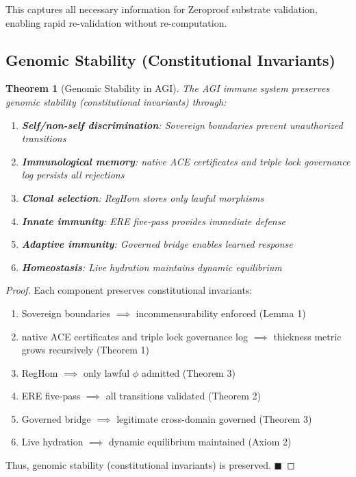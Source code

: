 \documentclass[11pt,a4paper]{article}
\newtheorem{theorem}{Theorem}[section]
\begin{document}
This captures all necessary information for Zeroproof substrate validation, enabling rapid re-validation without re-computation.

\subsection{Genomic Stability (Constitutional Invariants)}

\begin{theorem}[Genomic Stability in AGI]\label{thm:genomic_stability}
The AGI immune system preserves genomic stability (constitutional invariants) through:
\begin{enumerate}
    \item \textbf{Self/non-self discrimination}: Sovereign boundaries prevent unauthorized transitions
    \item \textbf{Immunological memory}: native ACE certificates and triple lock governance log persists all rejections
    \item \textbf{Clonal selection}: RegHom stores only lawful morphisms
    \item \textbf{Innate immunity}: ERE five-pass provides immediate defense
    \item \textbf{Adaptive immunity}: Governed bridge enables learned response
    \item \textbf{Homeostasis}: Live hydration maintains dynamic equilibrium
\end{enumerate}
\end{theorem}

\begin{proof}
Each component preserves constitutional invariants:
\begin{enumerate}
    \item Sovereign boundaries $\implies$ incommensurability enforced (Lemma 1)
    \item native ACE certificates and triple lock governance log $\implies$ thickness metric grows recursively (Theorem 1)
    \item RegHom $\implies$ only lawful $\phi$ admitted (Theorem 3)
    \item ERE five-pass $\implies$ all transitions validated (Theorem 2)
    \item Governed bridge $\implies$ legitimate cross-domain governed (Theorem 3)
    \item Live hydration $\implies$ dynamic equilibrium maintained (Axiom 2)
\end{enumerate}

Thus, genomic stability (constitutional invariants) is preserved. \hfill $\blacksquare$
\end{proof}
\end{document}
